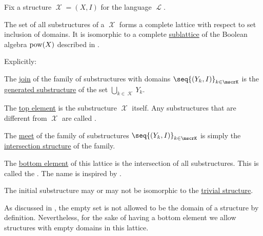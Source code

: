 \begin{proposition}\label{thm:substructures_form_complete_lattice}
  Fix a structure \( \mscrX = (X, I) \) for the language \( \mscrL \).

  The set of all substructures of a \( \mscrX \) forms a complete lattice with respect to set inclusion of domains. It is isomorphic to a complete \hyperref[def:semilattice/submodel]{sublattice} of the Boolean algebra \( \operatorname{pow}(X) \) described in .

  Explicitly:
  \begin{thmenum}
     The \hyperref[def:semilattice/join]{join} of the family of substructures with domains \( \seq{ (Y_k, I) }_{k \in \mscrK} \) is the \hyperref[def:first_order_generated_substructure]{generated substructure} of the set \( \bigcup_{k \in \mscrK} Y_k \).

     The \hyperref[def:extremal_points/top_and_bottom]{top element} is the substructure \( \mscrX \) itself. Any substructures that are different from \( \mscrX \) are called .

     The \hyperref[def:semilattice/meet]{meet} of the family of substructures \( \seq{ (Y_k, I) }_{k \in \mscrK} \) is simply the \hyperref[thm:def:first_order_substructure/intersection]{intersection structure} of the family.

     The \hyperref[def:extremal_points/top_and_bottom]{bottom element} of this lattice is the intersection of all substructures. This is called the . The name is inspired by .

    The initial substructure may or may not be isomorphic to the \hyperref[def:trivial_structure]{trivial structure}.

    As discussed in , the empty set is not allowed to be the domain of a structure by definition. Nevertheless, for the sake of having a bottom element we allow structures with empty domains in this lattice.
  \end{thmenum}
\end{proposition}
